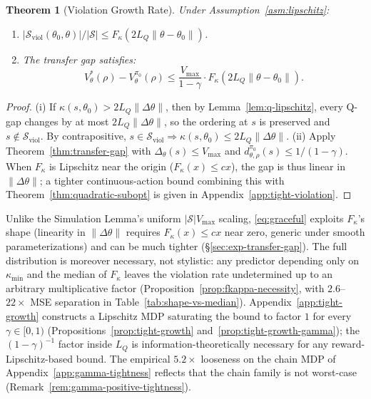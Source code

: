 \documentclass{article}
\newtheorem{theorem}{Theorem}
\newcommand{\cS}{\mathcal{S}}
\newcommand{\Sviol}{\mathcal{S}_{\mathrm{viol}}}
\newcommand{\Vmax}{V_{\max}}
\begin{document}
\begin{theorem}[Violation Growth Rate]
\label{thm:violation-growth}
Under Assumption~\ref{asm:lipschitz}:
\begin{enumerate}[leftmargin=*,itemsep=1pt]
\item $|\Sviol(\theta_0, \theta)| / |\cS| \leq F_\kappa(2L_Q\|\theta - \theta_0\|)$.
\item The transfer gap satisfies:
\begin{equation}
\label{eq:graceful}
V^*_\theta(\rho) - V^{\pi_0}_\theta(\rho) \leq \frac{\Vmax}{1-\gamma} \cdot F_\kappa(2L_Q\|\theta - \theta_0\|).
\end{equation}
\end{enumerate}
\end{theorem}

\begin{proof}
(i) If $\kappa(s, \theta_0) > 2L_Q\|\Delta\theta\|$, then by Lemma~\ref{lem:q-lipschitz}, every Q-gap changes by at most $2L_Q\|\Delta\theta\|$, so the ordering at $s$ is preserved and $s \notin \Sviol$. By contrapositive, $s \in \Sviol \Rightarrow \kappa(s, \theta_0) \leq 2L_Q\|\Delta\theta\|$. (ii) Apply Theorem~\ref{thm:transfer-gap} with $\Delta_\theta(s) \leq \Vmax$ and $d^{\pi_0}_{\theta,\rho}(s) \leq 1/(1-\gamma)$. When $F_\kappa$ is Lipschitz near the origin ($F_\kappa(x) \leq cx$), the gap is thus linear in $\|\Delta\theta\|$; a tighter continuous-action bound combining this with Theorem~\ref{thm:quadratic-subopt} is given in Appendix~\ref{app:tight-violation}.
\end{proof}

Unlike the Simulation Lemma's uniform $|\cS|\Vmax$ scaling, \eqref{eq:graceful} exploits $F_\kappa$'s shape (linearity in $\|\Delta\theta\|$ requires $F_\kappa(x) \leq cx$ near zero, generic under smooth parameterizations) and can be much tighter (\S\ref{sec:exp-transfer-gap}). The full distribution is moreover necessary, not stylistic: any predictor depending only on $\kappa_{\min}$ and the median of $F_\kappa$ leaves the violation rate undetermined up to an arbitrary multiplicative factor (Proposition~\ref{prop:fkappa-necessity}, with $2.6$--$22\times$ MSE separation in Table~\ref{tab:shape-vs-median}). Appendix~\ref{app:tight-growth} constructs a Lipschitz MDP saturating the bound to factor $1$ for every $\gamma \in [0,1)$ (Propositions~\ref{prop:tight-growth} and~\ref{prop:tight-growth-gamma}); the $(1-\gamma)^{-1}$ factor inside $L_Q$ is information-theoretically necessary for any reward-Lipschitz-based bound. The empirical $5.2\times$ looseness on the chain MDP of Appendix~\ref{app:gamma-tightness} reflects that the chain family is not worst-case (Remark~\ref{rem:gamma-positive-tightness}).
\end{document}
